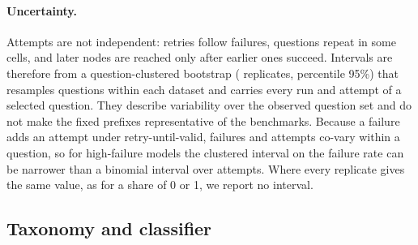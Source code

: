 \paragraph{Uncertainty.}
Attempts are not independent: retries follow failures, questions repeat
in some cells, and later nodes are reached only after earlier ones
succeed. Intervals are therefore from a question-clustered bootstrap
( replicates, percentile 95\%) that resamples
questions within each dataset and carries every run and attempt of a
selected question. They describe variability over the observed question
set and do not make the fixed prefixes representative of the benchmarks.
Because a failure adds an attempt under retry-until-valid, failures and
attempts co-vary within a question, so for high-failure models the
clustered interval on the failure rate can be narrower than a binomial
interval over attempts. Where every replicate gives the same value, as for
a share of 0 or 1, we report no interval.

\subsection{Taxonomy and classifier}
\label{sec:setup:taxonomy}

